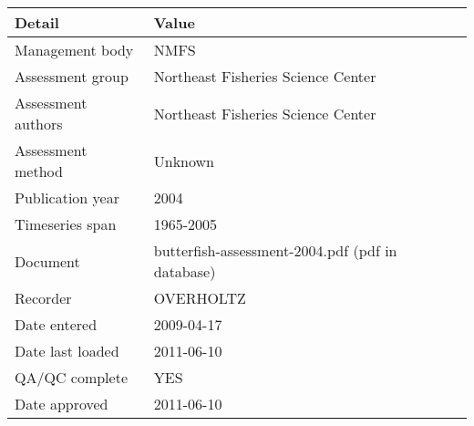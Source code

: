 \begin{table}[htb]
\centering
\begin{tabular}{lp{7cm}}
\toprule
Detail & Value \\
\midrule
Management body    & NMFS                                             \\
Assessment group   & Northeast Fisheries Science Center               \\
Assessment authors & Northeast Fisheries Science Center               \\
Assessment method  & Unknown                                          \\
Publication year   & 2004                                             \\
Timeseries span    & 1965-2005                                        \\
Document           & butterfish-assessment-2004.pdf (pdf in database) \\
Recorder           & OVERHOLTZ                                        \\
Date entered       & 2009-04-17                                       \\
Date last loaded   & 2011-06-10                                       \\
QA/QC complete     & YES                                              \\
Date approved      & 2011-06-10                                       \\
\bottomrule
\end{tabular}
\label{tab:assessdet}
\end{table}

